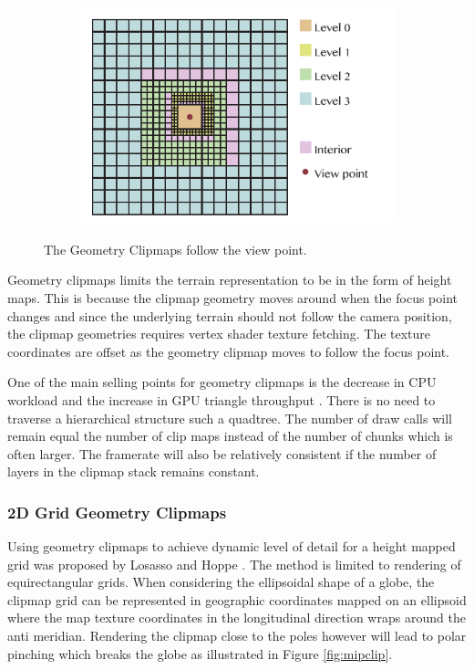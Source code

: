 \begin{figure}[htbp]
    \centering
    \begin{subfigure}[bt]{0.6\textwidth}
        \includegraphics[width=\textwidth]{figures/geometryclipmap/clipmap_geo.pdf}
    \end{subfigure}
    \caption{The Geometry Clipmaps follow the view point.}
    \label{fig:clipmapgeometry}
\end{figure}

Geometry clipmaps limits the terrain representation to be in the form of height maps. This is because the clipmap geometry moves around when the focus point changes and since the underlying terrain should not follow the camera position, the clipmap geometries requires vertex shader texture fetching. The texture coordinates are offset as the geometry clipmap moves to follow the focus point.

One of the main selling points for geometry clipmaps is the decrease in CPU workload and the increase in GPU triangle throughput \cite{cozzi11}. There is no need to traverse a hierarchical structure such a quadtree. The number of draw calls will remain equal the number of clip maps instead of the number of chunks which is often larger. The framerate will also be relatively consistent if the number of layers in the clipmap stack remains constant.

\subsubsection{2D Grid Geometry Clipmaps}
Using geometry clipmaps to achieve dynamic level of detail for a height mapped grid was proposed by Losasso and Hoppe \cite{losasso04}. The method is limited to rendering of equirectangular grids. When considering the ellipsoidal shape of a globe, the clipmap grid can be represented in geographic coordinates mapped on an ellipsoid where the map texture coordinates in the longitudinal direction wraps around the anti meridian. Rendering the clipmap close to the poles however will lead to polar pinching which breaks the globe as illustrated in Figure \ref{fig:mipclip}.

